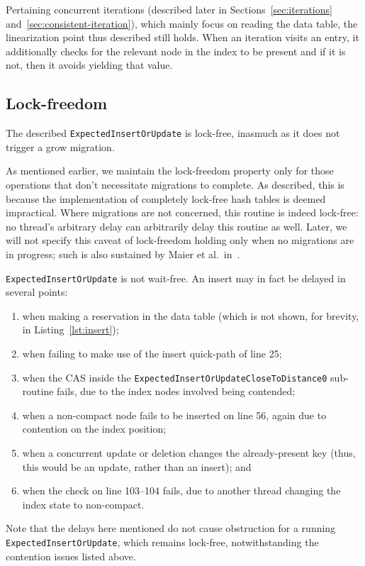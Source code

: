 Pertaining concurrent iterations (described later in Sections~\ref{sec:iterations} and~\ref{sec:consistent-iteration}), which mainly focus on reading the data table, the linearization point thus described still holds.
When an iteration visits an entry, it additionally checks for the relevant node in the index to be present and if it is not, then it avoids yielding that value.

\subsection{Lock-freedom}\label{subsec:insert-lock-freedom}

The described \texttt{ExpectedInsertOrUpdate} is lock-free, inasmuch as it does not trigger a grow migration.

As mentioned earlier, we maintain the lock-freedom property only for those operations that don't necessitate migrations to complete.
As described, this is because the implementation of completely lock-free hash tables is deemed impractical.
Where migrations are not concerned, this routine is indeed lock-free: no thread's arbitrary delay can arbitrarily delay this routine as well.
Later, we will not specify this caveat of lock-freedom holding only when no migrations are in progress; such is also sustained by Maier et al.\ in~\cite{maier}.

\texttt{ExpectedInsertOrUpdate} is not wait-free.
An insert may in fact be delayed in several points:
\begin{enumerate}
	\item when making a reservation in the data table (which is not shown, for brevity, in Listing~\ref{lst:insert});
	\item when failing to make use of the insert quick-path of line 25;
	\item when the CAS inside the \texttt{ExpectedInsertOrUpdateCloseToDistance0} sub-routine fails, due to the index nodes involved being contended;
	\item when a non-compact node fails to be inserted on line 56, again due to contention on the index position;
	\item when a concurrent update or deletion changes the already-present key (thus, this would be an update, rather than an insert); and
	\item when the check on line 103--104 fails, due to another thread changing the index state to non-compact.
\end{enumerate}
Note that the delays here mentioned do not cause obstruction for a running \texttt{ExpectedInsertOrUpdate}, which remains lock-free, notwithstanding the contention issues listed above.


